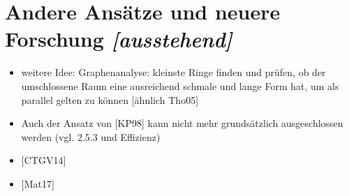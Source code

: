 \documentclass[../main/thesis.tex]{subfiles}
\begin{document}
\section[Andere Ansätze und neuere Forschung]{Andere Ansätze und neuere Forschung \emph{[ausstehend]}}
\label{ch:recent-research}

\begin{itemize}
\item weitere Idee: Graphenanalyse: kleinste Ringe finden und prüfen, ob der umschlossene Raum eine ausreichend schmale und lange Form hat, um als parallel gelten zu können [ähnlich Tho05]
\item Auch der Ansatz von [KP98] kann nicht mehr grundsätzlich ausgeschlossen werden (vgl. 2.5.3 und Effizienz)
\item {[CTGV14]}
\item {[Mat17]}
\end{itemize}




\end{document}
